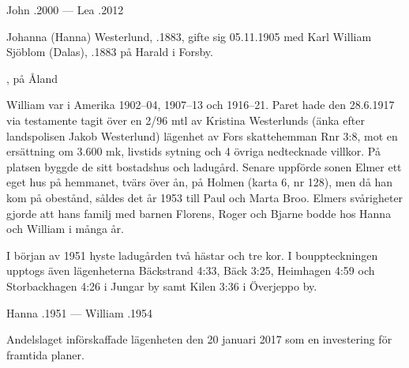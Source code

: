 John .2000  ---  Lea .2012


%
\jhvspace{}


%
Johanna (Hanna) Westerlund, .1883, gifte sig 05.11.1905 med Karl William Sjöblom (Dalas), .1883 på Harald i Forsby.
\begin{jhchildren}
  \item {}
  \item {}
  \item {}
  \item {}, på Åland
  \item {}
\end{jhchildren}

William var i Amerika 1902--04, 1907--13 och 1916--21. Paret hade den 28.6.1917 via testamente tagit över en 2/96 mtl av Kristina 	Westerlunds (änka efter landspolisen Jakob Westerlund) lägenhet av Fors skattehemman Rnr 3:8, mot en ersättning om 3.600 mk, livstids sytning och 4 övriga nedtecknade villkor. På platsen byggde de sitt bostadshus och ladugård. Senare uppförde sonen Elmer ett eget hus på hemmanet, tvärs över ån, på Holmen (karta 6, nr 128), men då han kom på obestånd, såldes det år 1953 till Paul och Marta Broo. Elmers svårigheter gjorde att hans familj med barnen Florens, Roger och Bjarne bodde hos Hanna och William i många år.

I början av 1951 hyste ladugården två hästar och tre kor. I bouppteckningen upptogs även lägenheterna Bäckstrand 4:33, Bäck 3:25, Heimhagen 4:59 och Storbackhagen 4:26 i Jungar by samt Kilen 3:36 i Överjeppo by.

Hanna .1951  --- 	William .1954



%


%
Andelslaget införskaffade lägenheten den 20 januari 2017 som en investering för framtida planer.\jhvspace{}


